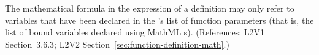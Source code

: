 The mathematical formula in the  expression of a
\FunctionDefinition definition may only refer to variables that have been
declared in the 's list of function parameters (that is, the
list of bound variables declared using MathML s).
(References: L2V1 Section~3.6.3; L2V2
Section~\ref{sec:function-definition-math}.)
